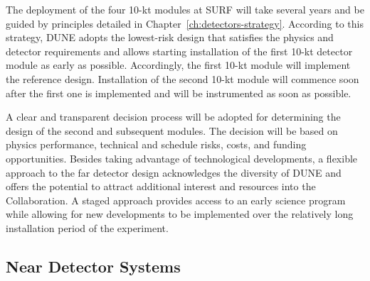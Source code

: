 The deployment of the four 10-kt modules at SURF will take several
years %
and be guided by principles detailed in
Chapter~\ref{ch:detectors-strategy}. According to this strategy, DUNE
 adopts the lowest-risk design that satisfies the
physics and detector requirements %
and allows starting installation of the first 10-kt detector module as early as possible.
Accordingly, the first 10-kt module will implement the reference design.   
Installation of the second 10-kt module will commence
soon after the first one is implemented   %
and will be instrumented as soon as possible. %


A clear and transparent decision process will be adopted for determining the design of the second
and subsequent modules. %
The decision will be based on physics performance,
technical and schedule risks, costs, and funding opportunities.  
Besides taking advantage of technological developments, a
flexible approach to the far detector design %
acknowledges the diversity of DUNE and offers the
potential to attract additional interest and resources into the
Collaboration. A staged approach provides access to an early science
program while allowing for %
new developments to be
implemented %
over the relatively long installation period of the experiment.

\subsection{Near Detector Systems}
\label{sec:intro-dune-near-det}


